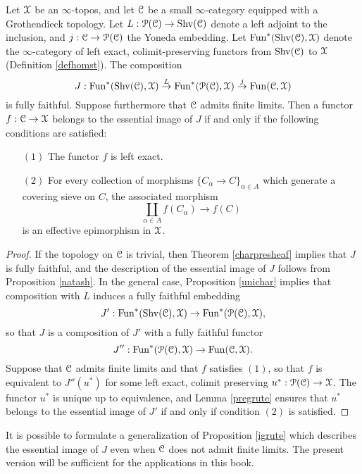 \begin{proposition}\label{igrute}
Let $\operatorname{\mathcal{X}}$ be an $\infty$-topos, and let $\operatorname{\mathcal{C}}$ be a small $\infty$-category equipped with a Grothendieck topology. Let
$L: \operatorname{\mathcal{P}}(\operatorname{\mathcal{C}}) \rightarrow \operatorname{Shv}(\operatorname{\mathcal{C}})$ denote a left adjoint to the inclusion, and
$j: \operatorname{\mathcal{C}} \rightarrow \operatorname{\mathcal{P}}(\operatorname{\mathcal{C}})$ the Yoneda embedding. Let
$\operatorname{Fun}^{\ast}( \operatorname{Shv}(\operatorname{\mathcal{C}}), \operatorname{\mathcal{X}} )$ denote the $\infty$-category of left exact, colimit-preserving functors from $\operatorname{Shv}(\operatorname{\mathcal{C}})$ to $\operatorname{\mathcal{X}}$ (Definition \ref{defhomst}). The composition
$$ J: \operatorname{Fun}^{\ast}(\operatorname{Shv}(\operatorname{\mathcal{C}}), \operatorname{\mathcal{X}}) \stackrel{L}{\rightarrow} \operatorname{Fun}^{\ast}( \operatorname{\mathcal{P}}(\operatorname{\mathcal{C}}), \operatorname{\mathcal{X}})
\stackrel{j}{\rightarrow} \operatorname{Fun}( \operatorname{\mathcal{C}}, \operatorname{\mathcal{X}})$$
is fully faithful. Suppose furthermore that $\operatorname{\mathcal{C}}$ admits finite limits. Then
a functor $f: \operatorname{\mathcal{C}} \rightarrow \operatorname{\mathcal{X}}$ belongs to the essential image of $J$ if and only if
the following conditions are satisfied:
\begin{itemize}
\item[$(1)$] The functor $f$ is left exact.
\item[$(2)$] For every collection of morphisms $\{ C_{\alpha} \rightarrow C\}_{\alpha \in A}$ which generate a covering sieve on $C$, the associated morphism
$$ \coprod_{\alpha \in A} f(C_{\alpha}) \rightarrow f(C)$$ is an effective epimorphism in $\operatorname{\mathcal{X}}$.
\end{itemize}
\end{proposition}

\begin{proof}
If the topology on $\operatorname{\mathcal{C}}$ is trivial, then Theorem \ref{charpresheaf} implies that
$J$ is fully faithful, and the description of the essential image of $J$ follows from Proposition \ref{natash}. In the general case, Proposition \ref{unichar} implies that
composition with $L$ induces a fully faithful embedding
$$ J': \operatorname{Fun}^{\ast}( \operatorname{Shv}(\operatorname{\mathcal{C}}) ,\operatorname{\mathcal{X}}) \rightarrow \operatorname{Fun}^{\ast}( \operatorname{\mathcal{P}}(\operatorname{\mathcal{C}}), \operatorname{\mathcal{X}}),$$
so that $J$ is a composition of $J'$ with a fully faithful functor
$$ J'': \operatorname{Fun}^{\ast}(\operatorname{\mathcal{P}}(\operatorname{\mathcal{C}}),\operatorname{\mathcal{X}}) \rightarrow \operatorname{Fun}(\operatorname{\mathcal{C}}, \operatorname{\mathcal{X}}).$$ 
Suppose that $\operatorname{\mathcal{C}}$ admits finite limits and that $f$ satisfies $(1)$, so that
$f$ is equivalent to $J''(u^{\ast})$ for some left exact, colimit preserving
$u^{\ast}: \operatorname{\mathcal{P}}(\operatorname{\mathcal{C}}) \rightarrow \operatorname{\mathcal{X}}$. The functor $u^{\ast}$ is unique up to equivalence,
and Lemma \ref{pregrute} ensures that $u^{\ast}$ belongs to the essential image of $J'$ if
and only if condition $(2)$ is satisfied.
\end{proof}

\begin{remark}
It is possible to formulate a generalization of Proposition \ref{igrute} which describes the essential image of $J$ even when $\operatorname{\mathcal{C}}$ does not admit finite limits. The present version will be sufficient for the applications in this book. 
\end{remark}

